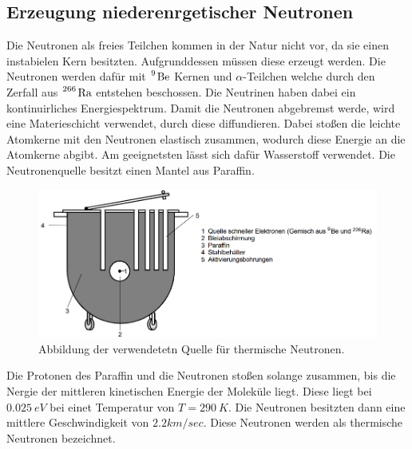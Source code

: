 \subsection{Erzeugung niederenrgetischer Neutronen}
Die Neutronen als freies Teilchen kommen in der Natur nicht vor, da sie einen instabielen Kern besitzten.
Aufgrunddessen müssen diese erzeugt werden.
Die Neutronen werden dafür mit $\ce{^{9} Be}$ Kernen und $\alpha$-Teilchen welche durch den Zerfall aus $\ce{^{266} Ra}$ entstehen beschossen.
Die Neutrinen haben dabei ein kontinuirliches Energiespektrum.
Damit die Neutronen abgebremst werde, wird eine Materieschicht verwendet, durch diese diffundieren.
Dabei stoßen die leichte Atomkerne mit den Neutronen elastisch zusammen, wodurch diese Energie an die Atomkerne abgibt.
Am geeignetsten lässt sich dafür Wasserstoff verwendet.
Die Neutronenquelle besitzt einen Mantel aus Paraffin. 
\begin{figure}
    \centering
    \includegraphics[scale=0.5]{content/Quelle Neutronen.png}
    \caption{Abbildung der verwendetetn Quelle für thermische Neutronen.}
    \label{fig:QN}
\end{figure}
Die Protonen des Paraffin und die Neutronen stoßen solange zusammen, bis die Nergie der mittleren kinetischen Energie der Moleküle liegt.
Diese liegt bei $\qty{0.025}{eV}$ bei einet Temperatur von $T= \qty{290}{K}$. 
Die Neutronen besitzten dann eine mittlere Geschwindigkeit von $2.2 km/sec$.
Diese Neutronen werden als thermische Neutronen bezeichnet.

